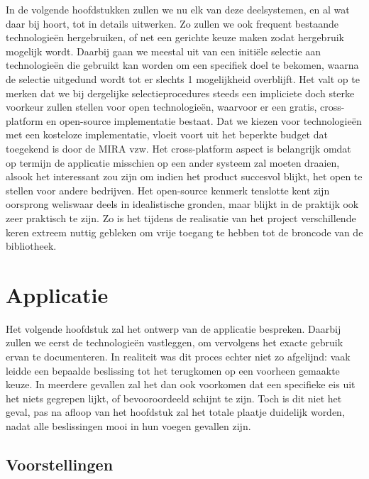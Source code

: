 In de volgende hoofdstukken zullen we nu elk van deze deelsystemen, en al wat daar bij hoort, tot in details uitwerken. Zo zullen we ook frequent bestaande technologieën hergebruiken, of net een gerichte keuze maken zodat hergebruik mogelijk wordt. Daarbij gaan we meestal uit van een initiële selectie aan technologieën die gebruikt kan worden om een specifiek doel te bekomen, waarna de selectie uitgedund wordt tot er slechts 1 mogelijkheid overblijft. Het valt op te merken dat we bij dergelijke selectieprocedures steeds een impliciete doch sterke voorkeur zullen stellen voor open technologieën, waarvoor er een gratis, cross-platform en open-source implementatie bestaat. Dat we kiezen voor technologieën met een kosteloze implementatie, vloeit voort uit het beperkte budget dat toegekend is door de MIRA vzw. Het cross-platform aspect is belangrijk omdat op termijn de applicatie misschien op een ander systeem zal moeten draaien, alsook het interessant zou zijn om indien het product succesvol blijkt, het open te stellen voor andere bedrijven. Het open-source kenmerk tenslotte kent zijn oorsprong weliswaar deels in idealistische gronden, maar blijkt in de praktijk ook zeer praktisch te zijn. Zo is het tijdens de realisatie van het project verschillende keren extreem nuttig gebleken om vrije toegang te hebben tot de broncode van de bibliotheek.


%
%

\chapter{Applicatie}
\label{ontwerp:applicatie}

Het volgende hoofdstuk zal het ontwerp van de applicatie bespreken. Daarbij zullen we eerst de technologieën vastleggen, om vervolgens het exacte gebruik ervan te documenteren. In realiteit was dit proces echter niet zo afgelijnd: vaak leidde een bepaalde beslissing tot het terugkomen op een voorheen gemaakte keuze. In meerdere gevallen zal het dan ook voorkomen dat een specifieke eis uit het niets gegrepen lijkt, of bevooroordeeld schijnt te zijn. Toch is dit niet het geval, pas na afloop van het hoofdstuk zal het totale plaatje duidelijk worden, nadat alle beslissingen mooi in hun voegen gevallen zijn.

\section{Voorstellingen}
\label{ontwerp:applicatie:voorstellingen}

